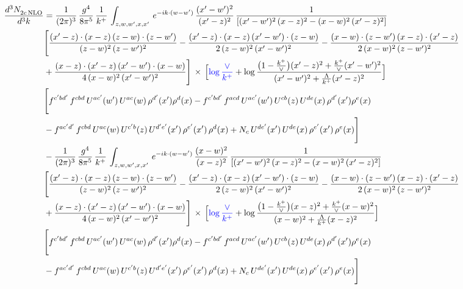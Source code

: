 \documentclass[9pt]{article}
\numberwithin{equation}{section}
\begin{document}
\begin{align}
    \frac{d^{3}N_{2c\,\rm NLO}^{\rm}}{d^{3}k}  & = \frac{1}{(2\pi)^{3}}\, \frac{g^{4}}{8\pi^{5}}\,\frac{1}{k^{+}}\,\int_{z,w,w^{\prime},x,x'}\, e^{-ik\cdot (w-w')}\,\frac{(x'-w')^{2}}{(x'-z)^{2}}\, \frac{1}{\left[(x'-w')^{2}\, (x-z)^{2} - (x-w)^{2}\, (x'-z)^{2}\right]} \notag \\ & \Bigg[\frac{(x'-z)\cdot (x-z)\, (z-w)\cdot (z-w')}{(z-w)^{2}\, (z-w')^{2}}-\frac{(x'-z)\cdot (x-z)\, (x'-w')\cdot (z-w)}{2\, (z-w)^{2}\, (x'-w')^{2}} -\frac{(x-w)\cdot (z-w')\, (x-z)\cdot (x'-z)}{2\, (x-w)^{2}\, (z-w')^{2}}\notag \\ & +\frac{(x-z)\cdot (x'-z)\, (x'-w')\cdot (x-w)}{4\, (x-w)^{2}\, (x'-w')^{2}}\Bigg]\,\times\, \Big[{\color{blue}\log\frac{\vee}{k^{+}}}+\log\frac{\big(1-\frac{k^{+}}{\vee}\big)(x'-z)^{2}+\frac{k^{+}}{\vee}(x'-w')^{2}}{(x'-w')^{2}+\frac{\Lambda}{k^{+}}(x'-z)^{2}}\Big] \notag \\ &  \Bigg[f^{c'bd'}\,f^{cbd}\, U^{ac'}(w')\,U^{ac}(w)\,\rho^{d'}(x')\rho^{d}(x)- f^{c'bd'}\,f^{acd}\,U^{ac'}(w')\,U^{cb}(z)\,U^{de}(x)\,\rho^{d'}(x')\rho^{e}(x) \notag \\ & -f^{ac'd'}\,f^{cbd}\,U^{ac}(w)\,U^{c'b}(z)\,U^{d'e'}(x')\,\rho^{e'}(x')\,\rho^{d}(x) +N_{c}\,U^{de'}(x')\,U^{de}(x)\,\rho^{e'}(x')\,\rho^{e}(x)\Bigg]\notag \\ & -\frac{1}{(2\pi)^{3}}\, \frac{g^{4}}{8\pi^{5}}\,\frac{1}{k^{+}}\,\int_{z,w,w^{\prime},x,x'}\, e^{-ik\cdot (w-w')}\,\frac{(x-w)^{2}}{(x-z)^{2}}\, \frac{1}{\left[(x'-w')^{2}\, (x-z)^{2} - (x-w)^{2}\, (x'-z)^{2}\right]} \notag \\ & \Bigg[\frac{(x'-z)\cdot (x-z)\, (z-w)\cdot (z-w')}{(z-w)^{2}\, (z-w')^{2}}-\frac{(x'-z)\cdot (x-z)\, (x'-w')\cdot (z-w)}{2\, (z-w)^{2}\, (x'-w')^{2}} -\frac{(x-w)\cdot (z-w')\, (x-z)\cdot (x'-z)}{2\, (x-w)^{2}\, (z-w')^{2}}\notag \\ & +\frac{(x-z)\cdot (x'-z)\, (x'-w')\cdot (x-w)}{4\, (x-w)^{2}\, (x'-w')^{2}}\Bigg]\,\times\, \Big[{\color{blue}\log\frac{\vee}{k^{+}}}+\log\frac{\big(1-\frac{k^{+}}{\vee}\big)(x-z)^{2}+\frac{k^{+}}{\vee}(x-w)^{2}}{(x-w)^{2}+\frac{\Lambda}{k^{+}}(x-z)^{2}}\Big] \notag \\ &  \Bigg[f^{c'bd'}\,f^{cbd}\, U^{ac'}(w')\,U^{ac}(w)\,\rho^{d'}(x')\rho^{d}(x)- f^{c'bd'}\,f^{acd}\,U^{ac'}(w')\,U^{cb}(z)\,U^{de}(x)\,\rho^{d'}(x')\rho^{e}(x) \notag \\ & -f^{ac'd'}\,f^{cbd}\,U^{ac}(w)\,U^{c'b}(z)\,U^{d'e'}(x')\,\rho^{e'}(x')\,\rho^{d}(x) +N_{c}\,U^{de'}(x')\,U^{de}(x)\,\rho^{e'}(x')\,\rho^{e}(x)\Bigg]
\end{align}
\end{document}
